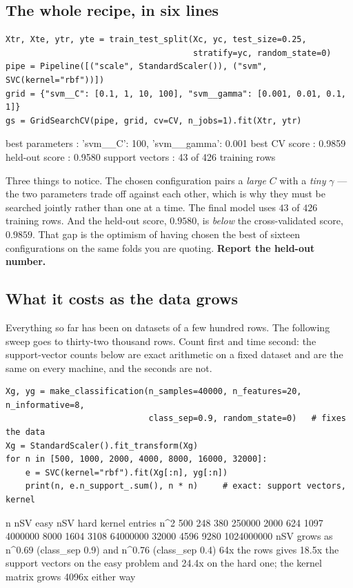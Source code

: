 \documentclass[11pt]{article}
\begin{document}
\subsection{The whole recipe, in six lines}

\begin{lstlisting}
Xtr, Xte, ytr, yte = train_test_split(Xc, yc, test_size=0.25,
                                      stratify=yc, random_state=0)
pipe = Pipeline([("scale", StandardScaler()), ("svm", SVC(kernel="rbf"))])
grid = {"svm__C": [0.1, 1, 10, 100], "svm__gamma": [0.001, 0.01, 0.1, 1]}
gs = GridSearchCV(pipe, grid, cv=CV, n_jobs=1).fit(Xtr, ytr)
\end{lstlisting}
\begin{codeout}
best parameters : {'svm__C': 100, 'svm__gamma': 0.001}
best CV score   : 0.9859
held-out score  : 0.9580
support vectors : 43 of 426 training rows
\end{codeout}

Three things to notice. The chosen configuration pairs a \emph{large} $C$ with
a \emph{tiny} $\gamma$ --- the two parameters trade off against each other,
which is why they must be searched jointly rather than one at a time. The final
model uses $43$ of $426$ training rows. And the held-out score, $0.9580$, is
\emph{below} the cross-validated score, $0.9859$. That gap is the optimism of
having chosen the best of sixteen configurations on the same folds you are
quoting. \textbf{Report the held-out number.}

\subsection{What it costs as the data grows}
\label{sec:cost}

Everything so far has been on datasets of a few hundred rows. The following
sweep goes to thirty-two thousand rows. Count first and time second: the
support-vector counts below are exact arithmetic on a fixed dataset and are
the same on every machine, and the seconds are not.

\begin{lstlisting}
Xg, yg = make_classification(n_samples=40000, n_features=20, n_informative=8,
                             class_sep=0.9, random_state=0)   # fixes the data
Xg = StandardScaler().fit_transform(Xg)
for n in [500, 1000, 2000, 4000, 8000, 16000, 32000]:
    e = SVC(kernel="rbf").fit(Xg[:n], yg[:n])
    print(n, e.n_support_.sum(), n * n)     # exact: support vectors, kernel
\end{lstlisting}
\begin{codeout}
     n     nSV easy   nSV hard   kernel entries n^2
   500        248        380               250000
  2000        624       1097              4000000
  8000       1604       3108             64000000
 32000       4596       9280           1024000000
nSV grows as n^0.69 (class_sep 0.9) and n^0.76 (class_sep 0.4)
64x the rows gives 18.5x the support vectors on the easy problem and
24.4x on the hard one; the kernel matrix grows 4096x either way
\end{codeout}
\end{document}
